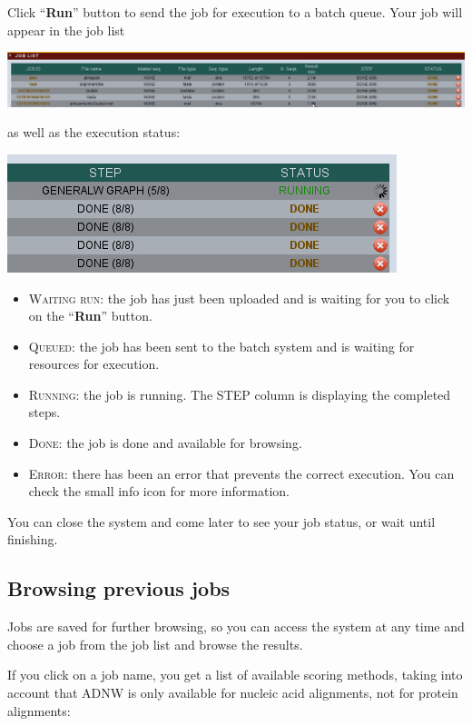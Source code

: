 \documentclass[12pt,oneside,a4paper,english]{article}  %
\begin{document}
Click ``\textbf{Run}'' button to send the job for execution to a batch queue. Your job will appear in the job list

\begin{center}
		\includegraphics[width=\linewidth]{pics/joblist.jpg}
\end{center}

as well as the execution status:

\begin{center}
		\includegraphics[width=.6\linewidth]{pics/run.jpg}
\end{center}

\begin{itemize}
\item \textsc{Waiting run}: the job has just been uploaded and is waiting for you to click on the ``\textbf{Run}'' button.
\item \textsc{Queued}: the job has been sent to the batch system and is waiting for resources for execution.
\item \textsc{Running}: the job is running. The STEP column is displaying the completed steps.
\item \textsc{Done}: the job is done and available for browsing.
\item \textsc{Error}: there has been an error that prevents the correct execution. You can check the small info icon for more information.
\end{itemize}

You can close the system and come later to see your job status, or wait until finishing.

\subsection*{Browsing previous jobs}

Jobs are saved for further browsing, so you can access the system at any time and choose a job from the job list and browse the results.

If you click on a job name, you get a list of available scoring methods, taking into account that ADNW is only available for nucleic acid alignments, not for protein alignments:
\end{document}
